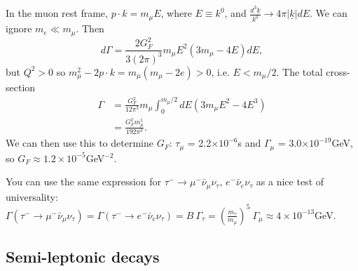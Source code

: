 \documentclass[a4paper,12pt]{article}
\begin{document}
In the muon rest frame, $p \cdot k = m_\mu E$, where $E \equiv k^0$, and $\frac{d^3\underline{k}}{k^0} \to 4\pi |\underline{k}|dE$. We can ignore $m_e \ll m_\mu$. Then
\begin{equation}
    d\Gamma = \frac{2G_F^2}{3(2\pi)^3} m_\mu E^2(3m_\mu - 4E)dE,
\end{equation}
but $Q^2 > 0$ so $m_\mu^2 - 2p\cdot k = m_\mu(m_\mu - 2e) >0$, i.e. $E < m_\mu/2$. The total cross-section
\begin{equation}
\begin{split}
    \Gamma &= \frac{G_F^2}{12\pi^3} m_\mu \int_0^{m_\mu/2} dE (3m_\mu E^2 - 4E^3) \\
    &= \frac{G_F^2 m_\mu^5}{192 \pi^3}.
\end{split}
\end{equation}
We can then use this to determine $G_F$: $\tau_\mu$ = 2.2$\times 10^{-6}$s and $\Gamma_\mu$ = 3.0$\times 10^{-19}$GeV, so $G_F \approx 1.2\times 10^{-5}$GeV$^{-2}$. 

You can use the same expression for $\tau^- \to \mu^- \bar{\nu}_\mu \nu_\tau$, $e^- \bar{\nu}_e \nu_\tau$ as a nice test of universality: $\Gamma(\tau^- \to \mu^- \bar{\nu}_\mu \nu_\tau) = \Gamma(\tau^- \to e^- \bar{\nu}_e \nu_\tau) = B\ \Gamma_\tau = (\frac{m_\tau}{m_\mu})^5\ \Gamma_\mu \approx 4 \times 10^{-13}$GeV.

\subsection{Semi-leptonic decays}
\end{document}
